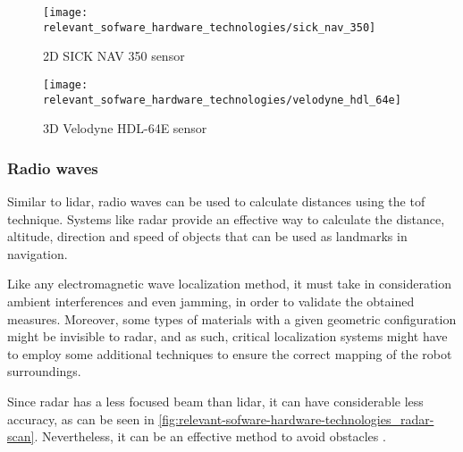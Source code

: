 \begin{savenotes}
\begin{figure}[H]
	\centering
	\begin{minipage}[h]{.47\textwidth}
		\centering
		\texttt{[image: relevant\_sofware\_hardware\_technologies/sick\_nav\_350]}
		\caption[2D SICK NAV 350 sensor]{2D SICK NAV 350 sensor\protect\footnotemark}
		\label{fig:relevant-sofware-hardware-technologies_sick-nav-350}
	\end{minipage}\hfill
{}
	\begin{minipage}[h]{.47\textwidth}
		\centering
		\texttt{[image: relevant\_sofware\_hardware\_technologies/velodyne\_hdl\_64e]}
		\caption[3D Velodyne HDL-64E sensor sensor]{3D Velodyne HDL-64E sensor\protect\footnotemark}
		\label{fig:relevant-sofware-hardware-technologies_velodyne-hdl-64e}
	\end{minipage}
\end{figure}
\end{savenotes}


\subsubsection{Radio waves}

Similar to \gls{lidar}, radio waves can be used to calculate distances using the \gls{tof} technique. Systems like \gls{radar} provide an effective way to calculate the distance, altitude, direction and speed of objects that can be used as landmarks in navigation.

Like any electromagnetic wave localization method, it must take in consideration ambient interferences and even jamming, in order to validate the obtained measures. Moreover, some types of materials with a given geometric configuration might be invisible to \gls{radar}, and as such, critical localization systems might have to employ some additional techniques to ensure the correct mapping of the robot surroundings.

Since \gls{radar} has a less focused beam than \gls{lidar}, it can have considerable less accuracy, as can be seen in \cref{fig:relevant-sofware-hardware-technologies_radar-scan}. Nevertheless, it can be an effective method to avoid obstacles \cite{Wu2007}.


